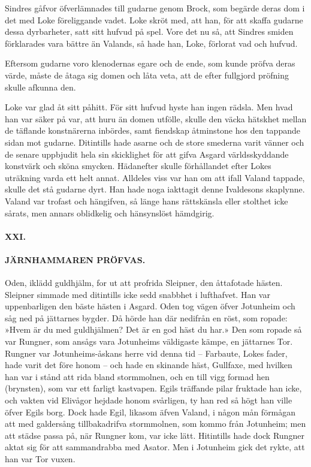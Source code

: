 Sindres gåfvor öfverlämnades till gudarne genom Brock, som begärde deras
dom i det med Loke föreliggande vadet. Loke skröt med, att han, för att
skaffa gudarne dessa dyrbarheter, satt sitt hufvud på spel. Vore det nu
så, att Sindres smiden förklarades vara bättre än Valands, så hade han,
Loke, förlorat vad och hufvud.

Eftersom gudarne voro klenodernas egare och de ende, som kunde pröfva
deras värde, måste de åtaga sig domen och låta veta, att de efter
fullgjord pröfning skulle afkunna den.

Loke var glad åt sitt påhitt. För sitt hufvud hyste han ingen rädsla.
Men hvad han var säker på var, att huru än domen utfölle, skulle den
väcka hätskhet mellan de täflande konstnärerna inbördes, samt fiendskap
åtminstone hos den tappande sidan mot gudarne. Ditintills hade asarne
och de store smederna varit vänner och de senare uppbjudit hela sin
skicklighet för att gifva Asgard världsskyddande konstvärk och sköna
smycken. Hädanefter skulle förhållandet efter Lokes uträkning varda ett
helt annat. Alldeles viss var han om att ifall Valand tappade, skulle
det stå gudarne dyrt. Han
\protect\hypertarget{lb1625905.xhtmlux5cux23start63}{}{}\protect\hypertarget{lb1625905.xhtmlux5cux23start63-a}{}{}\protect\hypertarget{lb1625905.xhtmlux5cux23start63-b}{}{}\protect\hypertarget{lb1625905.xhtmlux5cux23start63-c}{}{}\protect\hypertarget{lb1625905.xhtmlux5cux23start63-d}{}{}
hade noga iakttagit denne Ivaldesons skaplynne. Valand var trofast och
hängifven, så länge hans rättskänsla eller stolthet icke sårats, men
annars oblidkelig och hänsynslöst hämdgirig.

\paragraph{XXI.}

\paragraph{JÄRNHAMMAREN PRÖFVAS.}

Oden, iklädd guldhjälm, for ut att profrida Sleipner, den åttafotade
hästen. Sleipner simmade med ditintills icke sedd snabbhet i lufthafvet.
Han var uppenbarligen den bäste hästen i Asgard. Oden tog vägen öfver
Jotunheim och såg ned på jättarnes bygder. Då hörde han där nedifrån en
röst, som ropade: »Hvem är du med guldhjälmen? Det är en god häst du
har.» Den som ropade så var Rungner, som ansågs vara Jotunheims
väldigaste kämpe, en jättarnes Tor. Rungner var Jotunheims-åskans herre
vid denna tid -- Farbaute, Lokes fader, hade varit det före honom -- och
hade en skinande häst, Gullfaxe, med hvilken han var i stånd att rida
bland stormmolnen, och en till vigg formad hen (brynsten), som var ett
farligt kastvapen. Egils träffande pilar fruktade han icke, och vakten
vid Elivågor hejdade honom svårligen, ty han red så högt han ville öfver
Egils borg. Dock hade Egil, likasom äfven Valand, i någon mån förmågan
att med galdersång tillbakadrifva stormmolnen, som kommo från Jotunheim;
men att städse passa på, när Rungner kom, var icke lätt. Hitintills hade
dock Rungner aktat sig för att sammandrabba med Asator. Men i Jotunheim
gick det rykte, att han var Tor vuxen.

